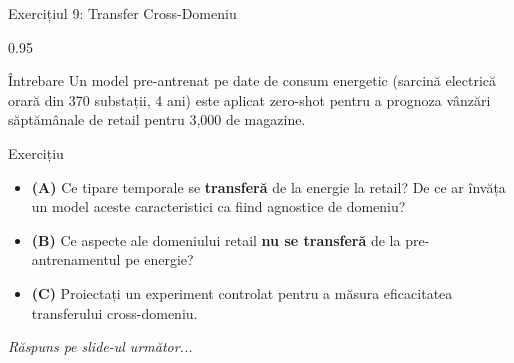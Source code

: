 \documentclass[9pt, aspectratio=169, t]{beamer}
\begin{document}
\begin{frame}{Exercițiul 9: Transfer Cross-Domeniu}
    \begin{cminipage}{0.95\textwidth}
    \begin{alertblock}{Întrebare}
        Un model pre-antrenat pe date de consum energetic (sarcină electrică orară din 370 substații, 4 ani) este aplicat zero-shot pentru a prognoza vânzări săptămânale de retail pentru 3{,}000 de magazine.
    \end{alertblock}

    \vspace{0.2cm}

    \begin{block}{Exercițiu}
        \begin{itemize}\setlength{\itemsep}{3pt}
            \item \textcolor{MainBlue}{\textbf{(A)}} Ce tipare temporale se \textbf{transferă} de la energie la retail? De ce ar învăța un model aceste caracteristici ca fiind agnostice de domeniu?
            \item \textcolor{MainBlue}{\textbf{(B)}} Ce aspecte ale domeniului retail \textbf{nu se transferă} de la pre-antrenamentul pe energie?
            \item \textcolor{MainBlue}{\textbf{(C)}} Proiectați un experiment controlat pentru a măsura eficacitatea transferului cross-domeniu.
        \end{itemize}
    \end{block}

    \vspace{0.2cm}

    \begin{center}
        \textit{Răspuns pe slide-ul următor...}
    \end{center}
    \end{cminipage}
\end{frame}
\end{document}
